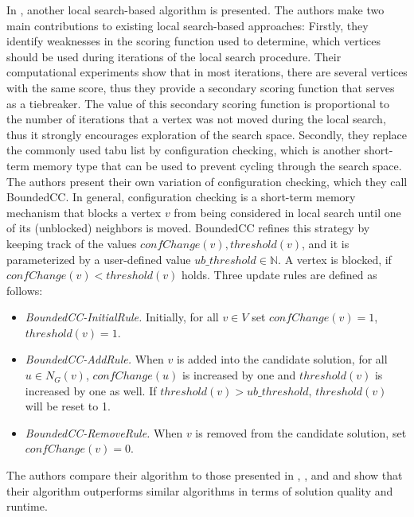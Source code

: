 \documentclass[draft,final]{vutinfth} %
\begin{document}
In \cite{chen_nuqclq_2021}, another local search-based algorithm is presented. The authors make two main contributions to existing local search-based approaches: Firstly, they identify weaknesses in the scoring function used to determine, which vertices should be used during iterations of the local search procedure. Their computational experiments show that in most iterations, there are several vertices with the same score, thus they provide a secondary scoring function that serves as a tiebreaker. The value of this secondary scoring function is proportional to the number of iterations that a vertex was not moved during the local search, thus it strongly encourages exploration of the search space. Secondly, they replace the commonly used tabu list by configuration checking, which is another short-term memory type that can be used to prevent cycling through the search space. The authors present their own variation of configuration checking, which they call BoundedCC. 
In general, configuration checking is a short-term memory mechanism that blocks a vertex $v$ from being considered in local search until one of its (unblocked) neighbors is moved. BoundedCC refines this strategy by keeping track of the values $\mathit{confChange(v)}, \mathit{threshold(v)}$, and it is parameterized by a user-defined value $\mathit{ub\_threshold} \in \mathbb{N}$. A vertex is blocked, if $\mathit{confChange(v)} < \mathit{threshold(v)}$ holds. Three update rules are defined as follows: 
\begin{itemize}
    \item \emph{BoundedCC-InitialRule.} Initially, for all $v \in V$ set $\mathit{confChange(v)} = 1$, \\$\mathit{threshold(v)} = 1$. 
    \item \emph{BoundedCC-AddRule.} When $v$ is added into the candidate solution, for all $u \in N_G(v)$, $\mathit{confChange(u)}$ is increased by one and $\mathit{threshold(v)}$ is increased by one as well. If $\mathit{threshold}(v) > \mathit{ub\_threshold}$, $\mathit{threshold(v)}$ will be reset to 1. 
    \item \emph{BoundedCC-RemoveRule.} When $v$ is removed from the candidate solution, set $confChange(v) = 0$. 
\end{itemize}
The authors compare their algorithm to those presented in \cite{pinto2021brkga}, \cite{djeddi_extension_2019}, and \cite{zhou_opposition-based_2020} and show that their algorithm outperforms similar algorithms in terms of solution quality and runtime. 
\end{document}
